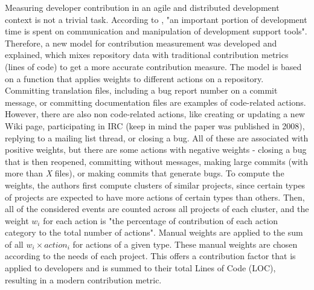 Measuring developer contribution in an agile and distributed development context is not a trivial task. According to \cite{Gousios_2008}, "an important portion of development time is spent on communication and manipulation of development support tools". Therefore, a new model for contribution measurement was developed and explained, which mixes repository data with traditional contribution metrics (lines of code) to get a more accurate contribution measure. The model is based on a function that applies weights to different actions on a repository. Committing translation files, including a bug report number on a commit message, or committing documentation files are examples of code-related actions. However, there are also non code-related actions, like creating or updating a new Wiki page, participating in IRC (keep in mind the paper was published in 2008), replying to a mailing list thread, or closing a bug. All of these are associated with positive weights, but there are some actions with negative weights - closing a bug that is then reopened, committing without messages, making large commits (with more than \textit{X} files), or making commits that generate bugs. To compute the weights, the authors first compute clusters of similar projects, since certain types of projects are expected to have more actions of certain types than others. Then, all of the considered events are counted across all projects of each cluster, and the weight $w_i$ for each action is "the percentage of contribution of each action category to the total number of actions". Manual weights are applied to the sum of all $w_i \times action_i$ for actions of a given type. These manual weights are chosen according to the needs of each project. This offers a contribution factor that is applied to developers and is summed to their total Lines of Code (LOC), resulting in a modern contribution metric.




